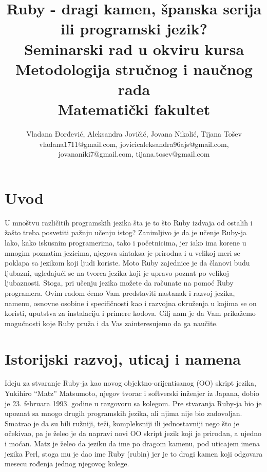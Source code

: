 \documentclass[a4paper]{article}
\begin{document}
\title{Ruby - dragi kamen, španska serija\\ ili programski jezik?\\ \small{Seminarski rad u okviru kursa\\Metodologija stručnog i naučnog rada\\ Matematički fakultet}}

\author{Vladana Đorđević, Aleksandra Jovičić, Jovana Nikolić, Tijana Tošev\\ vladana1711@gmail.com, jovicicaleksandra96ajs@gmail.com,\\ jovananiki7@gmail.com, tijana.tosev@gmail.com}


\maketitle


\tableofcontents

\newpage
\section{Uvod}
U mnoštvu različitih programskih jezika šta je to što Ruby izdvaja od ostalih i žašto treba posvetiti pažnju učenju istog? Zanimljivo je da je učenje Ruby-ja lako, kako iskusnim programerima, tako i početnicima, jer iako ima korene u mnogim poznatim jezicima, njegova sintaksa je prirodna i u velikoj meri se poklapa sa jezikom koji ljudi koriste. Moto Ruby zajednice je da članovi budu ljubazni, ugledajući se na tvorca jezika koji je upravo poznat po velikoj ljubaznosti. Stoga, pri učenju jezika možete da računate na pomoć Ruby programera. Ovim radom ćemo Vam predstaviti nastanak i razvoj jezika, namenu, osnovne osobine i specifičnosti kao i razvojna okruženja u kojima se on koristi, uputstva za instalaciju i primere kodova. Cilj nam je da Vam prikažemo mogućnosti koje Ruby pruža i da Vas zainteresujemo da ga naučite. 

\section{Istorijski razvoj, uticaj i namena}
Ideju za stvaranje Ruby-ja kao novog objektno-orijentisanog (OO) skript jezika, Yukihiro “Matz” Matsumoto, njegov tvorac i softverski inženjer iz Japana, dobio je 23. februara 1993. godine u razgovoru sa kolegom. Pre stvaranja Ruby-ja bio je upoznat sa mnogo drugih programskih jezika, ali njima nije bio zadovoljan. Smatrao je da su bili ružniji, teži, kompleksniji ili jednostavniji nego što je očekivao, pa je želeo je da napravi novi OO skript jezik koji je prirodan, a ujedno i moćan. Matz je želeo da jeziku da ime po dragom kamenu, pod uticajem imena jezika Perl, stoga mu je dao ime Ruby (rubin) jer je to dragi kamen koji odgovara mesecu rođenja jednog njegovog kolege.
\end{document}
